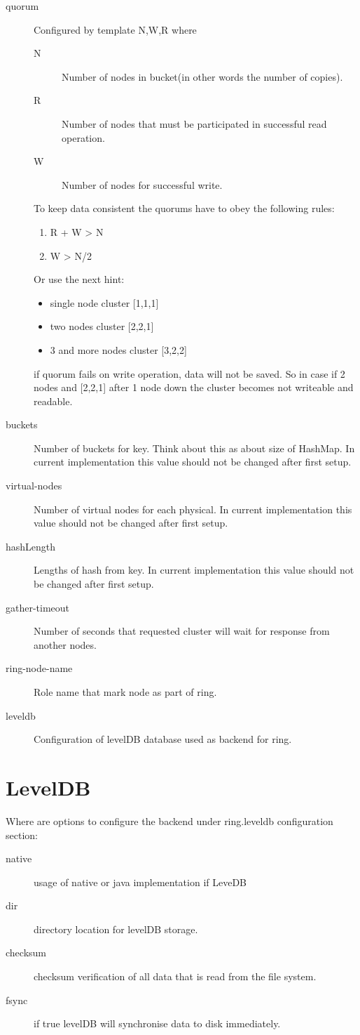 \begin{description}
\item[quorum] Configured by template N,W,R where

\begin{description}
\item[N] Number of nodes in bucket(in other words the number of copies).
\item[R] Number of nodes that must  be participated in successful read operation.
\item[W] Number of nodes for successful write.
\end{description}

To keep data consistent the quorums have to obey the following rules:
\begin{enumerate}
\item R + W > N
\item W > N/2
\end{enumerate}

Or use the next hint:
\begin{itemize}
\item single node cluster [1,1,1]
\item two nodes cluster [2,2,1]
\item 3 and more nodes cluster [3,2,2]
\end{itemize}
if quorum fails on write operation, data will not be saved. So in case if 2 nodes and [2,2,1] after 1 node down the cluster becomes not writeable and readable.
\item[buckets] Number of buckets for key. Think about this as about size of HashMap. In current implementation this value should not be changed after first setup.
\item[virtual-nodes] Number of virtual nodes for each physical. In current implementation this value should not be changed after first setup.
\item[hashLength] Lengths of hash from key. In current implementation this value should not be changed after first setup.
\item[gather-timeout] Number of seconds that requested cluster will wait for response from another nodes.
\item[ring-node-name] Role name that mark node as part of ring.
\item[leveldb] Configuration of levelDB database used as backend for ring.
\end{description}

\section{LevelDB}
Where are options to configure the backend under ring.leveldb configuration section:
\begin{description}
\item[native] usage of native or java implementation if LeveDB
\item[dir] directory location for levelDB storage.
\item[checksum] checksum verification of all data that is read from the file system.
\item[fsync] if true levelDB will synchronise data to disk immediately.
\end{description}